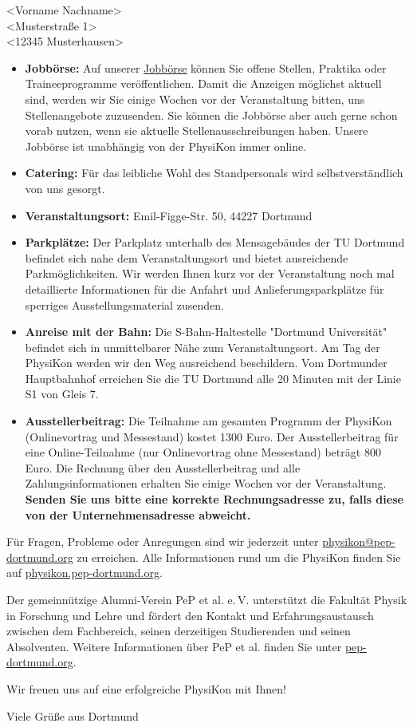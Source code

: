 \documentclass[
  pepbrief,
  fontsize=12pt,
  paper=a4,
  DIV=14,
  parskip=half,
  backaddress=false,
]{scrlttr2}
\begin{document}
\begin{letter}{%
  <Vorname Nachname>\\
  <Musterstraße 1> \\
  <12345 Musterhausen>
}
\begin{itemize}
    \item \textbf{Jobbörse:} Auf unserer \href{https://pep-dortmund.org/jobboerse/}{Jobbörse} können 
    Sie offene Stellen, Praktika oder Traineeprogramme veröffentlichen. Damit die Anzeigen möglichst 
    aktuell sind, werden wir Sie einige Wochen vor der Veranstaltung bitten, uns Stellenangebote zuzusenden. 
    Sie können die Jobbörse aber auch gerne schon vorab nutzen, wenn sie aktuelle Stellenausschreibungen haben.
    Unsere Jobbörse ist unabhängig von der PhysiKon immer online.
    \item \textbf{Catering:} Für das leibliche Wohl des Standpersonals wird selbstverständlich von uns gesorgt.
    \item \textbf{Veranstaltungsort:} Emil-Figge-Str. 50, 44227 Dortmund
    \item \textbf{Parkplätze:} Der Parkplatz unterhalb des Mensagebäudes der TU Dortmund befindet sich nahe dem Veranstaltungsort und bietet  
    ausreichende Parkmöglichkeiten. Wir werden Ihnen kurz vor der Veranstaltung noch mal detaillierte Informationen für die Anfahrt und Anlieferungsparkplätze für sperriges Ausstellungsmaterial zusenden. 
    \item \textbf{Anreise mit der Bahn:} Die S-Bahn-Haltestelle "Dortmund Universität" befindet sich in unmittelbarer Nähe zum Veranstaltungsort.
    Am Tag der PhysiKon werden wir den Weg ausreichend beschildern.
    Vom Dortmunder Hauptbahnhof erreichen Sie die TU Dortmund alle 20 Minuten mit der Linie S1 von Gleis 7.
    \item \textbf{Ausstellerbeitrag:} Die Teilnahme am gesamten Programm der PhysiKon (Onlinevortrag und Messestand) kostet 1300 Euro.
    Der Ausstellerbeitrag für eine Online-Teilnahme (nur Onlinevortrag ohne Messestand) beträgt 800 Euro.
    Die Rechnung über den Ausstellerbeitrag und alle Zahlungsinformationen erhalten Sie einige Wochen vor der Veranstaltung.
    \textbf{Senden Sie uns bitte eine korrekte Rechnungsadresse zu, falls diese von der Unternehmensadresse abweicht.}
\end{itemize}

Für Fragen, Probleme oder Anregungen sind wir jederzeit unter \href{mailto:physikon@pep-dortmund.org}{physikon@pep-dortmund.org} zu erreichen. 
Alle Informationen rund um die PhysiKon finden Sie auf \href{https://physikon.pep-dortmund.org/}{physikon.pep-dortmund.org}.

Der gemeinnützige Alumni-Verein PeP et al. e.\,V. unterstützt die Fakultät Physik in Forschung und Lehre und fördert den Kontakt und Erfahrungsaustausch zwischen dem Fachbereich,
seinen derzeitigen Studierenden und seinen Absolventen.
Weitere Informationen über PeP et al. finden Sie unter
\href{https://pep-dortmund.org/}{pep-dortmund.org}.

Wir freuen uns auf eine erfolgreiche PhysiKon mit Ihnen!

\closing{Viele Grüße aus Dortmund}

\end{letter}
\end{document}
